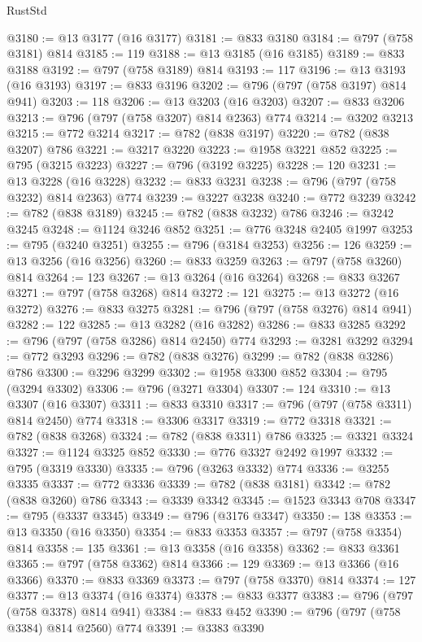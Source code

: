\begin{lexlean}{RustStd}
\begin{coremodule}
@3180 := @13 @3177 (@16 @3177)
@3181 := @833 @3180
@3184 := @797 (@758 @3181) @814
@3185 := 119
@3188 := @13 @3185 (@16 @3185)
@3189 := @833 @3188
@3192 := @797 (@758 @3189) @814
@3193 := 117
@3196 := @13 @3193 (@16 @3193)
@3197 := @833 @3196
@3202 := @796 (@797 (@758 @3197) @814 @941)
@3203 := 118
@3206 := @13 @3203 (@16 @3203)
@3207 := @833 @3206
@3213 := @796 (@797 (@758 @3207) @814 @2363) @774
@3214 := @3202 @3213
@3215 := @772 @3214
@3217 := @782 (@838 @3197)
@3220 := @782 (@838 @3207) @786
@3221 := @3217 @3220
@3223 := @1958 @3221 @852
@3225 := @795 (@3215 @3223)
@3227 := @796 (@3192 @3225)
@3228 := 120
@3231 := @13 @3228 (@16 @3228)
@3232 := @833 @3231
@3238 := @796 (@797 (@758 @3232) @814 @2363) @774
@3239 := @3227 @3238
@3240 := @772 @3239
@3242 := @782 (@838 @3189)
@3245 := @782 (@838 @3232) @786
@3246 := @3242 @3245
@3248 := @1124 @3246 @852
@3251 := @776 @3248 @2405 @1997
@3253 := @795 (@3240 @3251)
@3255 := @796 (@3184 @3253)
@3256 := 126
@3259 := @13 @3256 (@16 @3256)
@3260 := @833 @3259
@3263 := @797 (@758 @3260) @814
@3264 := 123
@3267 := @13 @3264 (@16 @3264)
@3268 := @833 @3267
@3271 := @797 (@758 @3268) @814
@3272 := 121
@3275 := @13 @3272 (@16 @3272)
@3276 := @833 @3275
@3281 := @796 (@797 (@758 @3276) @814 @941)
@3282 := 122
@3285 := @13 @3282 (@16 @3282)
@3286 := @833 @3285
@3292 := @796 (@797 (@758 @3286) @814 @2450) @774
@3293 := @3281 @3292
@3294 := @772 @3293
@3296 := @782 (@838 @3276)
@3299 := @782 (@838 @3286) @786
@3300 := @3296 @3299
@3302 := @1958 @3300 @852
@3304 := @795 (@3294 @3302)
@3306 := @796 (@3271 @3304)
@3307 := 124
@3310 := @13 @3307 (@16 @3307)
@3311 := @833 @3310
@3317 := @796 (@797 (@758 @3311) @814 @2450) @774
@3318 := @3306 @3317
@3319 := @772 @3318
@3321 := @782 (@838 @3268)
@3324 := @782 (@838 @3311) @786
@3325 := @3321 @3324
@3327 := @1124 @3325 @852
@3330 := @776 @3327 @2492 @1997
@3332 := @795 (@3319 @3330)
@3335 := @796 (@3263 @3332) @774
@3336 := @3255 @3335
@3337 := @772 @3336
@3339 := @782 (@838 @3181)
@3342 := @782 (@838 @3260) @786
@3343 := @3339 @3342
@3345 := @1523 @3343 @708
@3347 := @795 (@3337 @3345)
@3349 := @796 (@3176 @3347)
@3350 := 138
@3353 := @13 @3350 (@16 @3350)
@3354 := @833 @3353
@3357 := @797 (@758 @3354) @814
@3358 := 135
@3361 := @13 @3358 (@16 @3358)
@3362 := @833 @3361
@3365 := @797 (@758 @3362) @814
@3366 := 129
@3369 := @13 @3366 (@16 @3366)
@3370 := @833 @3369
@3373 := @797 (@758 @3370) @814
@3374 := 127
@3377 := @13 @3374 (@16 @3374)
@3378 := @833 @3377
@3383 := @796 (@797 (@758 @3378) @814 @941)
@3384 := @833 @452
@3390 := @796 (@797 (@758 @3384) @814 @2560) @774
@3391 := @3383 @3390

\end{coremodule}
\end{lexlean}
